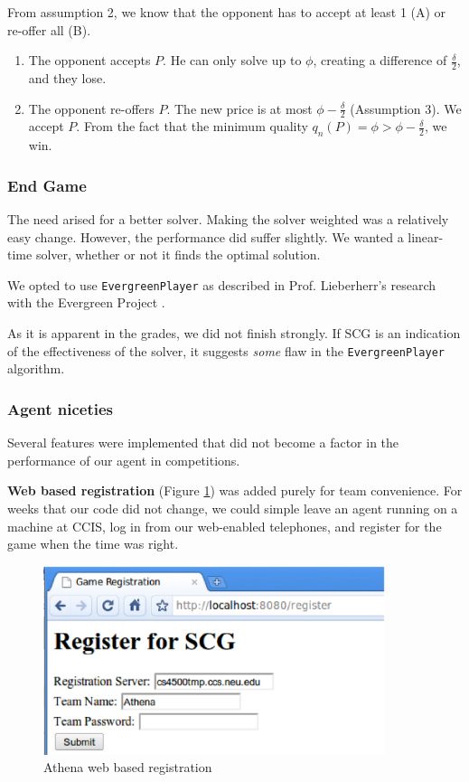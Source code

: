 \documentclass[letterpaper,12pt,oneside]{article}
\begin{document}
From assumption 2, we know that the opponent has to accept at least 1 (A)
or re-offer all (B).

\begin{enumerate}
\renewcommand{\labelenumi}{(\Alph{enumi})}
    \item The opponent accepts $P$. He can only solve up to $\phi$,
          creating a difference of $\frac{\delta}{2}$, and they lose.
    \item The opponent re-offers $P$. The new price is at most $\phi -
          \frac{\delta}{2}$ (Assumption 3). We accept $P$. From
          the fact that the minimum quality $q_n(P) = \phi > \phi -
          \frac{\delta}{2}$, we win.
\end{enumerate}

\subsubsection{End Game}

The need arised for a better solver. Making the solver weighted was a
relatively easy change. However, the performance did suffer slightly. We
wanted a linear-time solver, whether or not it finds the optimal solution.

We opted to use {\tt EvergreenPlayer} as described in Prof. Lieberherr's
research with the Evergreen Project \cite{Evergreen:lscs-07}.

As it is apparent in the grades, we did not finish strongly. If SCG is an
indication of the effectiveness of the solver, it suggests {\em some} flaw
in the {\tt EvergreenPlayer} algorithm.

\subsubsection{Agent niceties}

Several features were implemented that did not become a factor in the
performance of our agent in competitions.

\textbf{Web based registration} (Figure \ref{fig:registration}) was added
purely for team convenience. For weeks that our code did not change, we
could simple leave an agent running on a machine at CCIS, log in from our
web-enabled telephones, and register for the game when the time was right.

\begin{figure}[htp]
\centering
\includegraphics[width=100mm]{registration.eps}
\caption{Athena web based registration}
\label{fig:registration}
\end{figure}
\end{document}
